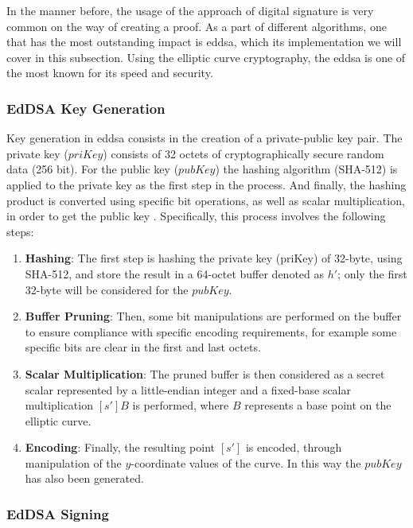 In the manner before, the usage of the approach of digital signature is very common on the way of creating a proof. As a part of different algorithms, one that has the most 
outstanding impact is \gls{eddsa}, which its implementation we will cover in this subsection. Using the elliptic curve cryptography, the \gls{eddsa} is one of the most known for its 
speed and security.

\subsubsection{EdDSA Key Generation}

Key generation in \gls{eddsa} consists in the creation of a private-public key pair. The private key ($priKey$) consists of 32 octets of cryptographically secure random data 
(256 bit). For the public key ($pubKey$) the hashing algorithm (SHA-512) is applied to the private key as the first step in the process. And finally, the hashing product is 
converted using specific bit operations, as well as scalar multiplication, in order to get the public key \cite{10054286}. Specifically, this process involves the following steps:

\begin{enumerate}
  \item \textbf{Hashing}: The first step is hashing the private key (priKey) of 32-byte, using SHA-512, and store the result in a 64-octet buffer denoted as $h'$; only the 
  first 32-byte will be considered for the $pubKey$.
  \item \textbf{Buffer Pruning}: Then, some bit manipulations are performed on the buffer to ensure compliance with specific encoding requirements, for example some specific
  bits are clear in the first and last octets.
  \item \textbf{Scalar Multiplication}: The pruned buffer is then considered as a secret scalar represented by a little-endian integer and a fixed-base scalar multiplication
  $[s']B$ is performed, where $B$ represents a base point on the elliptic curve. 
  \item \textbf{Encoding}: Finally, the resulting point $[s']$ is encoded, through manipulation of the $y$-coordinate values of the curve. In this way the $pubKey$ has also 
  been generated.
\end{enumerate}

\subsubsection{EdDSA Signing}

